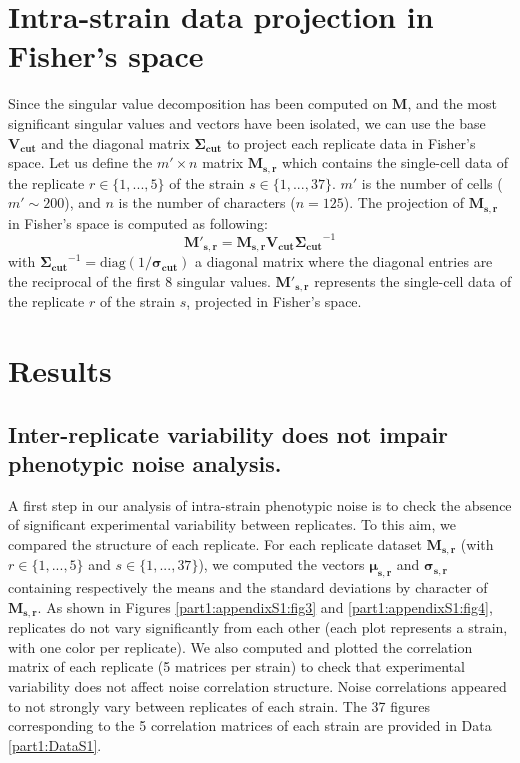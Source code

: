 
\section*{Intra-strain data projection in Fisher's space}
Since the singular value decomposition has been computed on $\boldsymbol{M}$, and the most significant singular values and vectors have been isolated, we can use the base $\boldsymbol{V_{cut}}$ and the diagonal matrix $\boldsymbol{\Sigma_{cut}}$ to project each replicate data in Fisher's space. Let us define the $m' \times n$ matrix $\boldsymbol{M_{s,r}}$ which contains the single-cell data of the replicate $r \in \{1,...,5\}$ of the strain $s \in \{1,...,37\}$. $m'$ is the number of cells ($m' \sim 200$), and $n$ is the number of characters ($n=125$). The projection of $\boldsymbol{M_{s,r}}$ in Fisher's space is computed as following:
\begin{equation}
\boldsymbol{M'_{s,r}} = \boldsymbol{M_{s,r}} \boldsymbol{V_{cut}} \boldsymbol{\Sigma_{cut}}^{-1}
\label{eq:part1:sigmaFGM:projection}
\end{equation}
with $\boldsymbol{\Sigma_{cut}}^{-1} = \mathrm{diag}(1/\boldsymbol{\sigma_{cut}})$ a diagonal matrix where the diagonal entries are the reciprocal of the first 8 singular values. $\boldsymbol{M'_{s,r}}$ represents the single-cell data of the replicate $r$ of the strain $s$, projected in Fisher's space.


\section*{Results}


\subsection*{Inter-replicate variability does not impair phenotypic noise analysis.}

A first step in our analysis of intra-strain phenotypic noise is to check the absence of significant experimental variability between replicates. To this aim, we compared the structure of each replicate. For each replicate dataset $\boldsymbol{M_{s,r}}$ (with $r \in \{1,...,5\}$ and $s \in \{1,...,37\}$), we computed the vectors $\boldsymbol{\mu_{s,r}}$ and $\boldsymbol{\sigma_{s,r}}$ containing respectively the means and the standard deviations by character of $\boldsymbol{M_{s,r}}$. As shown in Figures \ref{part1:appendixS1:fig3} and \ref{part1:appendixS1:fig4}, replicates do not vary significantly from each other (each plot represents a strain, with one color per replicate). We also computed and plotted the correlation matrix of each replicate (5 matrices per strain) to check that experimental variability does not affect noise correlation structure. Noise correlations appeared to not strongly vary between replicates of each strain. The 37 figures corresponding to the 5 correlation matrices of each strain are provided in Data \ref{part1:DataS1}.


